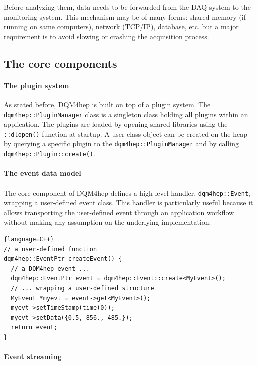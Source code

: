 \documentclass{webofc}
\begin{document}
Before analyzing them, data needs to be forwarded from the DAQ system to the monitoring system.
This mechanism may be of many forms: shared-memory (if running on same computers), network (TCP/IP), database, etc. but a major requirement is to avoid slowing or crashing the acquisition process.

\subsection{The core components}
\label{subsec:core}

\paragraph{The plugin system}

As stated before, DQM4hep is built on top of a plugin system.
The \texttt{dqm4hep::PluginManager} class is a singleton class holding all plugins within an application.
The plugins are loaded by opening shared libraries using the \texttt{::dlopen()} function at startup.
A user class object can be created on the heap by querying a specific plugin to the \texttt{dqm4hep::PluginManager} and
by calling \texttt{dqm4hep::Plugin::create()}.

\paragraph{The event data model}

The core component of DQM4hep defines a high-level handler, \texttt{dqm4hep::Event}, wrapping a user-defined event class.
This handler is particularly useful because it allows transporting the user-defined event through an application
workflow without making any assumption on the underlying implementation:

\begin{lstlisting}{language=C++}
// a user-defined function
dqm4hep::EventPtr createEvent() {
  // a DQM4hep event ...
  dqm4hep::EventPtr event = dqm4hep::Event::create<MyEvent>();
  // ... wrapping a user-defined structure
  MyEvent *myevt = event->get<MyEvent>();
  myevt->setTimeStamp(time(0));
  myevt->setData({0.5, 856., 485.});
  return event;
}
\end{lstlisting}

\paragraph{Event streaming}
\end{document}
